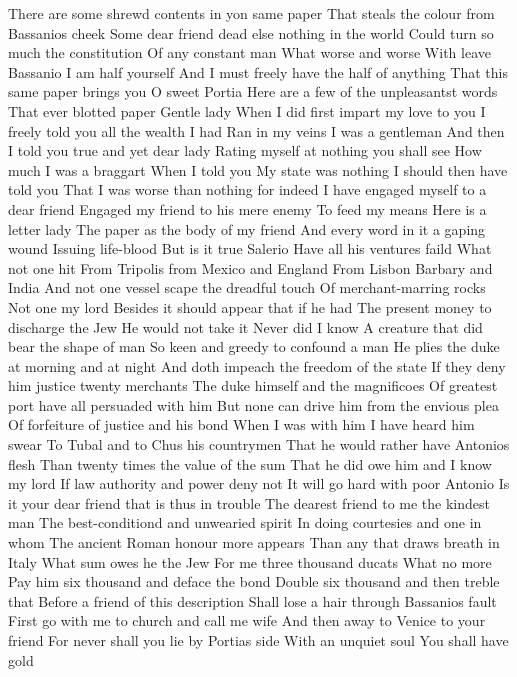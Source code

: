 There are some shrewd contents in yon same paper 
That steals the colour from Bassanios cheek 
Some dear friend dead else nothing in the world 
Could turn so much the constitution 
Of any constant man What worse and worse 
With leave Bassanio I am half yourself 
And I must freely have the half of anything 
That this same paper brings you 
O sweet Portia 
Here are a few of the unpleasantst words 
That ever blotted paper Gentle lady 
When I did first impart my love to you 
I freely told you all the wealth I had 
Ran in my veins I was a gentleman 
And then I told you true and yet dear lady 
Rating myself at nothing you shall see 
How much I was a braggart When I told you 
My state was nothing I should then have told you 
That I was worse than nothing for indeed 
I have engaged myself to a dear friend 
Engaged my friend to his mere enemy 
To feed my means Here is a letter lady 
The paper as the body of my friend 
And every word in it a gaping wound 
Issuing life-blood But is it true Salerio 
Have all his ventures faild What not one hit 
From Tripolis from Mexico and England 
From Lisbon Barbary and India 
And not one vessel scape the dreadful touch 
Of merchant-marring rocks 
Not one my lord 
Besides it should appear that if he had 
The present money to discharge the Jew 
He would not take it Never did I know 
A creature that did bear the shape of man 
So keen and greedy to confound a man 
He plies the duke at morning and at night 
And doth impeach the freedom of the state 
If they deny him justice twenty merchants 
The duke himself and the magnificoes 
Of greatest port have all persuaded with him 
But none can drive him from the envious plea 
Of forfeiture of justice and his bond 
When I was with him I have heard him swear 
To Tubal and to Chus his countrymen 
That he would rather have Antonios flesh 
Than twenty times the value of the sum 
That he did owe him and I know my lord 
If law authority and power deny not 
It will go hard with poor Antonio 
Is it your dear friend that is thus in trouble 
The dearest friend to me the kindest man 
The best-conditiond and unwearied spirit 
In doing courtesies and one in whom 
The ancient Roman honour more appears 
Than any that draws breath in Italy 
What sum owes he the Jew 
For me three thousand ducats 
What no more 
Pay him six thousand and deface the bond 
Double six thousand and then treble that 
Before a friend of this description 
Shall lose a hair through Bassanios fault 
First go with me to church and call me wife 
And then away to Venice to your friend 
For never shall you lie by Portias side 
With an unquiet soul You shall have gold 
